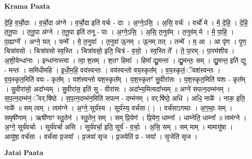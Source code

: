 \documentclass[17pt]{extarticle}
\begin{document}
\textbf{Krama Paata} \newline

दे॒हि॒ व॒र्चो॒दाः । व॒र्चो॒दा अ॑ग्ने । व॒र्चो॒दा इति॑ वर्चः - दाः । अ॒ग्ने॒ऽसि॒ । अ॒सि॒ वर्चः॑ । वर्चो॑ मे । मे॒ दे॒हि॒ । दे॒हि॒ त॒नू॒पाः । त॒नू॒पा अ॑ग्ने । त॒नू॒पा इति॑ तनू - पाः । अ॒ग्ने॒ऽसि॒ । अ॒सि॒ त॒नुव᳚म् । त॒नुव॑म् मे । मे॒ पा॒हि॒ । पा॒ह्यग्ने᳚ । अग्ने॒ यत् । यन्मे᳚ । मे॒ त॒नुवाः᳚ । त॒नुवा॑ ऊ॒नम् । ऊ॒नम् तत् । तन्मे᳚ । म॒ आ । आ पृ॑ण । पृ॒ण॒ चित्रा॑वसो । चित्रा॑वसो स्व॒स्ति । चित्रा॑वसो॒ इति॒ चित्र॑ - व॒सो॒ । स्व॒स्ति ते᳚ । ते॒ पा॒रम् । पा॒रम॑शीय । अ॒शी॒येन्धा॑नाः । इन्धा॑नास्त्वा । त्वा॒ श॒तम् । श॒तꣳ हिमाः᳚ । हिमा᳚ द्यु॒मन्तः॑ । द्यु॒मन्तः॒ सम् । द्यु॒मन्त॒ इति॑ द्यु - मन्तः॑ । समि॑धीमहि । इ॒धी॒म॒हि॒ वय॑स्वन्तः । वय॑स्वन्तो वय॒स्कृत᳚म् । व॒य॒स्कृतं॒ ॅयश॑स्वन्तः । व॒य॒स्कृत॒मिति॑ वयः - कृत᳚म् । यश॑स्वन्तो यश॒स्कृत᳚म् । य॒श॒स्कृतꣳ॑ सु॒वीरा॑सः । य॒श॒स्कृत॒मिति॑ यशः - कृत᳚म् । सु॒वीरा॑सो॒ अदा᳚भ्यम् । सु॒वीरा॑स॒ इति॑ सु - वीरा॑सः । 
अदा᳚भ्य॒मित्यदा᳚भ्यम् ॥ अग्ने॑ सपत्न॒दम्भ॑नम् । स॒प॒त्न॒दम्भ॑नं॒ ॅवर्.षि॑ष्ठे । स॒प॒त्न॒दम्भ॑न॒मिति॑ सपत्न - दम्भ॑नम् । वर्.षि॑ष्ठे॒ अधि॑ । अधि॒ नाके᳚ । नाक॒ इति॒ नाके᳚ ॥ सम् त्वम् । त्वम॑ग्ने । अ॒ग्ने॒ सूर्य॑स्य । सूर्य॑स्य॒ वर्च॑सा ( ) । वर्च॑साऽगथाः । अ॒ग॒थाः॒ सम् । समृषी॑णाम् । ऋषी॑णाꣳ स्तु॒तेन॑ । स्तु॒तेन॒ सम् । सम् प्रि॒येण॑ । प्रि॒येण॒ धाम्ना᳚ । धाम्नेति॒ धाम्ना᳚ ॥ त्वम॑ग्ने । अ॒ग्ने॒ सूर्य॑वर्चाः । सूर्य॑वर्चा असि । सूर्य॑वर्चा॒ इति॒ सूर्य॑ - व॒र्चाः॒ । अ॒सि॒ सम् । सम् माम् । मामायु॑षा । आयु॑षा॒ वर्च॑सा । वर्च॑सा प्र॒जया᳚ । प्र॒जया॑ सृज । प्र॒जयेति॑ प्र - जया᳚ । सृ॒जेति॑ सृज । \newline

\textbf{Jatai Paata} \newline
\end{document}
